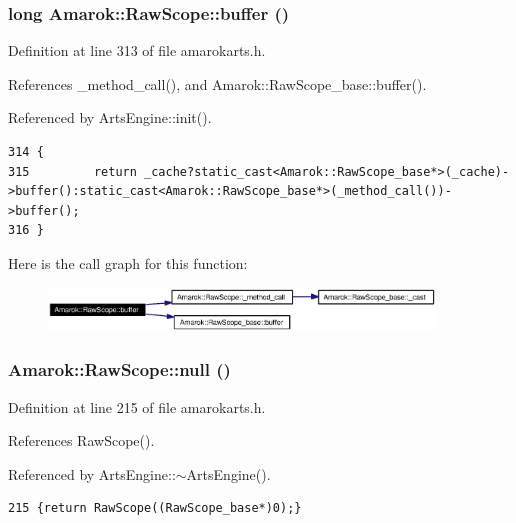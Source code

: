 \subsubsection{\setlength{\rightskip}{0pt plus 5cm}long Amarok::Raw\-Scope::buffer ()\hspace{0.3cm}{\tt  [inline]}}\label{classAmarok_1_1RawScope_Amarok_1_1RawScopea16}




Definition at line 313 of file amarokarts.h.

References \_\-method\_\-call(), and Amarok::Raw\-Scope\_\-base::buffer().

Referenced by Arts\-Engine::init().



\footnotesize\begin{verbatim}314 {
315         return _cache?static_cast<Amarok::RawScope_base*>(_cache)->buffer():static_cast<Amarok::RawScope_base*>(_method_call())->buffer();
316 }
\end{verbatim}\normalsize 


Here is the call graph for this function:\begin{figure}[H]
\begin{center}
\leavevmode
\includegraphics[width=291pt]{classAmarok_1_1RawScope_Amarok_1_1RawScopea16_cgraph}
\end{center}
\end{figure}
\subsubsection{ Amarok::Raw\-Scope::null ()\hspace{0.3cm}{\tt  [inline, static]}}\label{classAmarok_1_1RawScope_Amarok_1_1RawScopee0}




Definition at line 215 of file amarokarts.h.

References Raw\-Scope().

Referenced by Arts\-Engine::$\sim$Arts\-Engine().



\footnotesize\begin{verbatim}215 {return RawScope((RawScope_base*)0);}
\end{verbatim}\normalsize 


